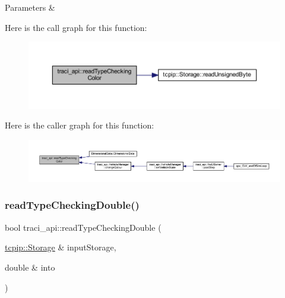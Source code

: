 \begin{DoxyParams}{Parameters}
{\em } & \\
\hline
\end{DoxyParams}
Here is the call graph for this function\+:\nopagebreak
\begin{figure}[H]
\begin{center}
\leavevmode
\includegraphics[width=350pt]{namespacetraci__api_af8c7656fbd212acb13f037d4fb20f1f7_cgraph}
\end{center}
\end{figure}
Here is the caller graph for this function\+:\nopagebreak
\begin{figure}[H]
\begin{center}
\leavevmode
\includegraphics[width=350pt]{namespacetraci__api_af8c7656fbd212acb13f037d4fb20f1f7_icgraph}
\end{center}
\end{figure}
\mbox{\label{namespacetraci__api_a5229be0b43fc9f5d9f413d5e51924b50}} 
\subsubsection{\texorpdfstring{read\+Type\+Checking\+Double()}{readTypeCheckingDouble()}}
{\footnotesize\ttfamily bool traci\+\_\+api\+::read\+Type\+Checking\+Double (\begin{DoxyParamCaption}\item[{\hyperlink{classtcpip_1_1_storage}{tcpip\+::\+Storage} \&}]{input\+Storage,  }\item[{double \&}]{into }\end{DoxyParamCaption})}



